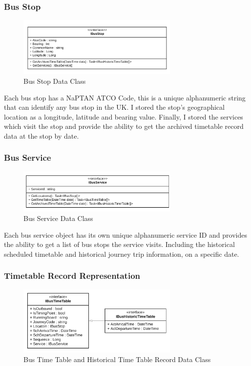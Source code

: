 \documentclass{article}
\begin{document}
\subsubsection{Bus Stop}

\begin{figure}[H]
	\centering
	\includegraphics[width=300px]{images/CD_Stop.png}
	\caption{Bus Stop Data Class}
	\label{fig:busstopdata}
\end{figure}


Each bus stop has a NaPTAN ATCO Code, this is a unique alphanumeric string that can identify any bus stop in the UK. I stored the stop's geographical location as a longitude, latitude and bearing value. Finally, I stored the services which visit the stop and provide the ability to get the archived timetable record data at the stop by date.  


\subsubsection{Bus Service}
\begin{figure}[H]
	\centering
	\includegraphics[width=300px]{images/CD_Service.png}
	\caption{Bus Service Data Class}
	\label{fig:busservicedata}
\end{figure}

Each bus service object has its own unique alphanumeric service ID and provides the ability to get a list of bus stops the service visits. Including the historical scheduled timetable and historical journey trip information, on a specific date.


\subsubsection{Timetable Record Representation}
\label{timetableRecord}

\begin{figure}[H]
	\centering
	\includegraphics[width=300px]{images/CD_TimetableH.png}
	\caption{Bus Time Table and Historical Time Table Record Data Class}
	\label{fig:bustimetabledata}
\end{figure}
\end{document}
